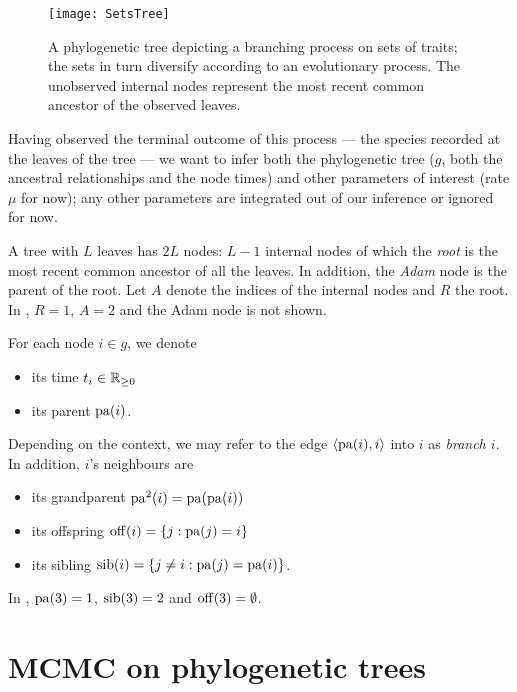 \documentclass[11pt,a4paper]{article}
\begin{document}
\begin{figure}[htb]
	\centering
	\texttt{[image: SetsTree]}
    \caption{A phylogenetic tree depicting a branching process on sets of traits; the sets in turn diversify according to an evolutionary process. The unobserved \textcolor{myblue}{internal nodes} represent the most recent common ancestor of the observed \textcolor{mygreen}{leaves}.}
    \label{fig:phylogenetic-tree}
\end{figure}

Having observed the terminal outcome of this process --- the species recorded at the leaves of the tree --- we want to infer both the phylogenetic tree ($ g $, both the ancestral relationships and the node times) and other parameters of interest (rate $ \mu $ for now); any other parameters are integrated out of our inference or ignored for now.

A tree with $ L $ leaves has $ 2 L $ nodes: $ L - 1 $ internal nodes of which the \emph{root} is the most recent common ancestor of all the leaves. In addition, the \emph{Adam} node is the parent of the root. Let $ A $ denote the indices of the internal nodes and $ R $ the root. In , $ R = 1 $, $ A = 2 $ and the Adam node is not shown.

For each node $ i \in g $, we denote
\begin{itemize}
    \item its time $ t_i \in \mathbb{R}_{\geq 0} $
    \item its parent $ \operatorname*{\mathrm{pa}}(i) $.
\end{itemize}
Depending on the context, we may refer to the edge $ \langle\operatorname*{\mathrm{pa}}(i), i\rangle $ into $ i $ as \emph{branch $ i $}. In addition, $ i $'s neighbours are
\begin{itemize}
    \item its grandparent $ \operatorname*{\mathrm{pa}}^2(i) = \operatorname*{\mathrm{pa}}(\operatorname*{\mathrm{pa}}(i)) $
    \item its offspring $ \operatorname*{\mathrm{off}}(i) = \{j : \operatorname*{\mathrm{pa}}(j) = i\} $
    \item its sibling $ \operatorname*{\mathrm{sib}}(i) = \{j \neq i : \operatorname*{\mathrm{pa}}(j) = \operatorname*{\mathrm{pa}}(i)\} $.
\end{itemize}
In , $ \operatorname*{\mathrm{pa}}(3) = 1 $, $ \operatorname*{\mathrm{sib}}(3) = 2 $ and $ \operatorname*{\mathrm{off}}(3) = \emptyset $.


\section{MCMC on phylogenetic trees}
\end{document}
